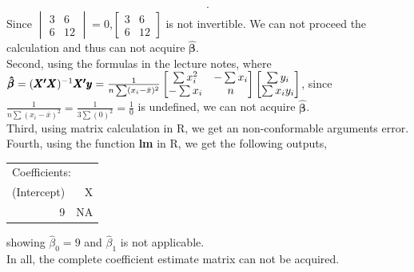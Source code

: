 \documentclass[10pt]{article}
\begin{document}
\begin{enumerate}[1)]
\begin{align*}
.
\end{align*}
Since $
  \begin{vmatrix}
    3 & 6\\
    6 & 12
  \end{vmatrix}
=0$,$
  \begin{bmatrix}
    3 & 6\\
    6 & 12
  \end{bmatrix}
$ is not invertible. We can not proceed the calculation and thus can not acquire $\pmb{\hat{\beta}}$.\\
Second, using the formulas in the lecture notes, where $\pmb{\hat{\beta}}=(\pmb{X\textsuperscript{$\prime$}}\pmb{X})^{-1}\pmb{X\textsuperscript{$\prime$}}\pmb{y}=\frac{1}{n\sum(x_i-\bar{x})^2}
  \begin{bmatrix}
    \sum{x_i^2} & -\sum{x_i}\\
    -\sum{x_i} & n
  \end{bmatrix}
  \begin{bmatrix}
    \sum{y_i}\\
    \sum{x_i y_i}
  \end{bmatrix}$, since $\frac{1}{n\sum(x_i-\bar{x})^2}=\frac{1}{3\sum(0)^2}=\frac{1}{0}$ is undefined, we can not acquire $\pmb{\hat{\beta}}$.\\
Third, using matrix calculation in R, we get an non-conformable arguments error.\\
Fourth, using the function \textbf{lm} in R, we get the following outputs,\\
\begin{table}[H]
\centering
\begin{tabular}{rr}
\multicolumn{2}{l}{Coefficients:} \\
(Intercept)          & X          \\
9                    & NA
\end{tabular}
\end{table}
showing $\hat{\beta}_0=9$ and $\hat{\beta}_1$ is not applicable.\\
In all, the complete coefficient estimate matrix can not be acquired.


\end{enumerate}
\end{document}
